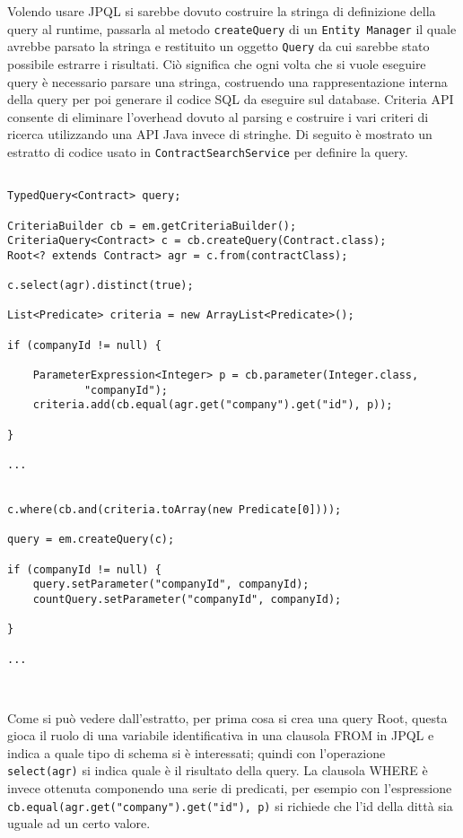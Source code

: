 Volendo usare JPQL si sarebbe dovuto costruire la stringa di definizione della query al runtime, passarla al metodo \lstinline{createQuery} di un
\texttt{Entity Manager} il quale avrebbe parsato la stringa e restituito un oggetto \texttt{Query} da cui sarebbe stato possibile estrarre i risultati.
Ciò significa che ogni volta che si vuole eseguire query è necessario parsare una stringa, costruendo una rappresentazione interna della query per poi generare il codice SQL da
eseguire sul database. Criteria API consente di eliminare l'overhead dovuto al parsing e costruire i vari criteri di ricerca utilizzando una API Java invece
di stringhe. Di seguito è mostrato un estratto di codice usato in \texttt{ContractSearchService} per definire la query.

\begin{lstlisting}

TypedQuery<Contract> query;

CriteriaBuilder cb = em.getCriteriaBuilder();
CriteriaQuery<Contract> c = cb.createQuery(Contract.class);
Root<? extends Contract> agr = c.from(contractClass);

c.select(agr).distinct(true);

List<Predicate> criteria = new ArrayList<Predicate>();

if (companyId != null) {

	ParameterExpression<Integer> p = cb.parameter(Integer.class,
			"companyId");
	criteria.add(cb.equal(agr.get("company").get("id"), p));

}

...


c.where(cb.and(criteria.toArray(new Predicate[0])));
	
query = em.createQuery(c);

if (companyId != null) {
	query.setParameter("companyId", companyId);
	countQuery.setParameter("companyId", companyId);

}

...	

 
\end{lstlisting}

Come si può vedere dall'estratto, per prima cosa si crea una query Root, questa gioca il ruolo di una variabile identificativa in una clausola FROM 
in JPQL e indica a quale tipo di schema si è interessati; quindi con l'operazione \lstinline{select(agr)} si indica quale è il
risultato della query. La clausola WHERE è invece ottenuta componendo una serie di predicati, per esempio con l'espressione
\lstinline{cb.equal(agr.get("company").get("id"), p)} si richiede che l'id della dittà sia uguale ad un certo valore.



